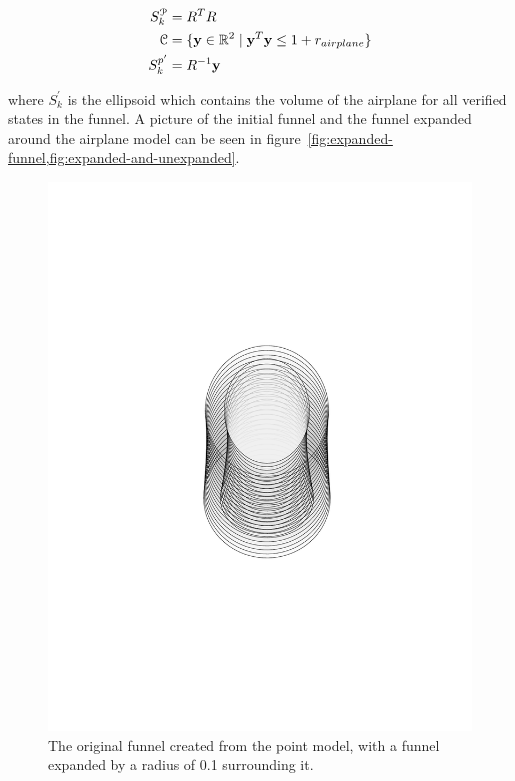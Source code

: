 \begin{align*}
  S_{k}^{\mathcal{P}} &= R^{T}R \\
  \mathcal{C} &= \lbrace\mathbf{y} \in \mathbb{R}^2 \mid \mathbf{y}^{T}\mathbf{y} \leq 1 + r_{airplane}\rbrace \\
  S_{k}^{p'} &= R^{-1}\mathbf{y} \\
\end{align*}

where \(S_{k}^{'}\) is the ellipsoid which contains the volume of the airplane
for all verified states in the funnel. A picture of the initial funnel and the
funnel expanded around the airplane model can be seen in
figure~\cref{fig:expanded-funnel,fig:expanded-and-unexpanded}.

\begin{figure}
  \centering \includegraphics[clip, trim=6cm 8cm 6cm 8cm,
  scale=.5]{figures/method/expanded-funnel}
  \caption{The original funnel created from the point model, with a funnel
    expanded by a radius of 0.1 surrounding it.}
  \label{fig:expanded-funnel}
\end{figure}


